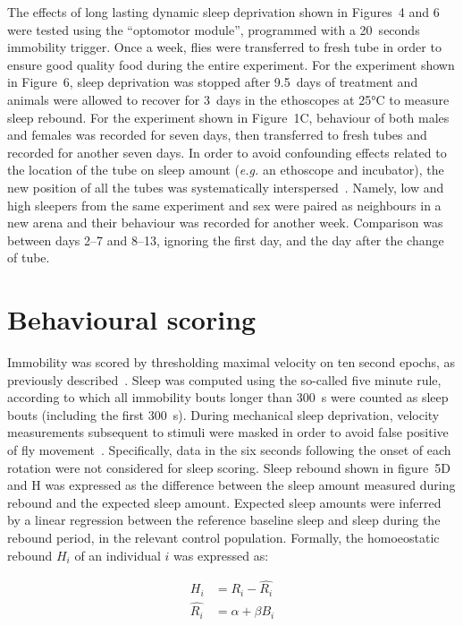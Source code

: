 \documentclass[a4paper,twoside,openright]{article}
\begin{document}
The effects of long lasting dynamic sleep deprivation shown in Figures~4 and 6 were tested using the ``optomotor module'', programmed with a 20~seconds immobility trigger.
Once a week, flies were transferred to fresh tube in order to ensure good quality food during the entire experiment.
For the experiment shown in Figure~6,  sleep deprivation was stopped after 9.5~days of treatment and animals were allowed to recover for 3~days in the ethoscopes at 25°C to measure sleep rebound.
%
%
For the experiment shown in Figure~1C, behaviour of both males and females was recorded for seven days, then transferred to fresh tubes and recorded for another seven days.
In order to avoid confounding effects related to the location of the tube on sleep amount (\emph{e.g.} an ethoscope and incubator), the new position of all the tubes was systematically interspersed~\cite{hurlbert_pseudoreplication_1984}.
Namely, low and high sleepers from the same experiment and sex were paired as neighbours in a new arena and their behaviour was recorded for another week. Comparison was between days 2--7 and 8--13, ignoring the first day, and the day after the change of tube.
%


\section*{Behavioural scoring}
Immobility was scored by thresholding maximal velocity on ten second epochs, as previously described~\cite{geissmann_ethoscopes:_2017}.
Sleep was computed using the so-called five minute rule, according to which all immobility bouts longer than 300~s were counted as sleep bouts (including the first 300~s).
During mechanical sleep deprivation, velocity measurements subsequent to stimuli were masked in order to avoid false positive of fly movement~\cite{geissmann_ethoscopes:_2017}.
Specifically, data in the six seconds following the onset of each rotation were not considered for sleep scoring. 
Sleep rebound shown in figure~5D and H  was expressed as the difference between the sleep amount measured during rebound and the expected sleep amount.  Expected sleep amounts were inferred by a linear regression between the reference baseline sleep and sleep during the rebound period, in the relevant control population. Formally, the homoeostatic rebound $H_i$ of an individual $i$ was expressed as:

\begin{align}
H_i &=  R_i - \hat{R_i} \\
\hat{R_i} &= \alpha + \beta{} B_i
\end{align}
\end{document}
